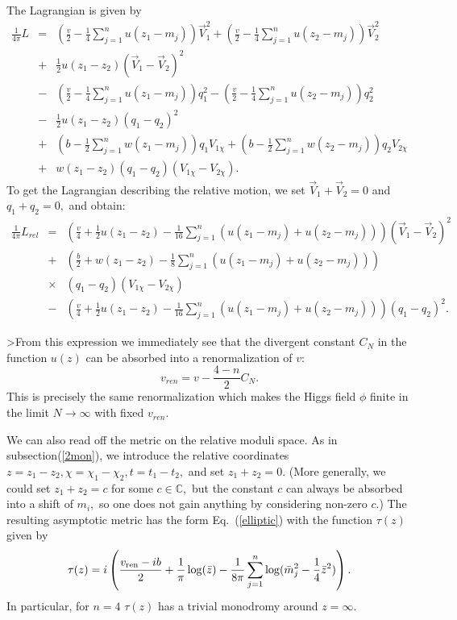\documentclass[a4paper,12pt, amsfonts, amssymb]{article}
\newcommand{\CC}{{\mathbb C}}
\newcommand{\ra}{\rightarrow}
\newcommand{\nn}{\nonumber}
\newcommand{\vr}{v_{{\rm ren}}}
\begin{document}
The Lagrangian is given by
\begin{eqnarray}
\frac{1}{4\pi} L&=& \left(\frac{v}{2}-\frac{1}{4}\sum_{j=1}^n u(z_1-m_j)\right) \vec{V}_1^2+
\left(\frac{v}{2}-\frac{1}{4}\sum_{j=1}^n u(z_2-m_j)\right)\vec{V}_2^2\nn\\
&+&\frac{1}{2}u(z_1-z_2)\left(\vec{V}_1-\vec{V}_2\right)^2\nn\\
&-&\left(\frac{v}{2}-\frac{1}{4}\sum_{j=1}^n u(z_1-m_j)\right) q_1^2-
\left(\frac{v}{2}-\frac{1}{4}\sum_{j=1}^n u(z_2-m_j)\right)q_2^2\nn\\
&-&\frac{1}{2}u(z_1-z_2)\left(q_1-q_2\right)^2\nn\\
&+&\left(b-\frac{1}{2}\sum_{j=1}^n w(z_1-m_j)\right)q_1V_{1\chi}+
\left(b-\frac{1}{2}\sum_{j=1}^n w(z_2-m_j)\right)q_2V_{2\chi}\nn\\
&+&w(z_1-z_2)(q_1-q_2)\left(V_{1\chi}-V_{2\chi}\right).\nn
\end{eqnarray}
To get the Lagrangian describing the relative motion, we set $\vec{V}_1+\vec{V}_2=0$ and $q_1+q_2=0,$ and obtain:
\begin{eqnarray}
\frac{1}{4\pi}L_{rel}\!\!\!&=&\!\!\!\left(\frac{v}{4}+\frac{1}{2}u(z_1-z_2)-
\frac{1}{16}\sum_{j=1}^n(u(z_1-m_j)+u(z_2-m_j))\right)
\left(\vec{V}_1-\vec{V}_2\right)^2\nn\\
&+&\!\!\!\left(\frac{b}{2}+w(z_1-z_2)-\frac{1}{8}
\sum_{j=1}^n(u(z_1-m_j)+u(z_2-m_j))\right)\nn\\
&\times &\!\!\! (q_1-q_2)\left(V_{1\chi}-V_{2\chi}\right)\nn\\
&-&\!\!\!\left(\frac{v}{4}+\frac{1}{2}u(z_1-z_2)-\frac{1}{16}
\sum_{j=1}^n(u(z_1-m_j)+u(z_2-m_j))\right)(q_1-q_2)^2.\nn
\end{eqnarray}

>From this expression we immediately see that the divergent constant $C_N$
in the function $u(z)$ can be absorbed into a renormalization of $v$:
$$
v_{ren}=v-\frac{4-n}{2} C_N.
$$
This is precisely the same renormalization which makes the Higgs field
$\phi$ finite in the limit $N\ra\infty$ with fixed $v_{ren}.$

We can also read off the metric on the relative moduli space.
As in subsection(\ref{2mon}), we introduce the relative coordinates
$z=z_1-z_2, \chi=\chi_1-\chi_2, t=t_1-t_2,$ and set $z_1+z_2=0.$ (More generally, we could set $z_1+z_2=c$ for some $c\in\CC,$ but the constant
$c$ can always be absorbed into a shift of $m_i,$ so one does not gain
anything by considering non-zero
$c$.) The resulting asymptotic metric has the form Eq.~(\ref{elliptic})
with the function $\tau(z)$ given by
\begin{equation}\label{tausing}
\tau(z)=i\left(\frac{\vr-ib}{2}+\frac{1}{\pi}\log(\bar{z})-
\frac{1}{8\pi}\sum_{j=1}^n\log(\bar{m}_j^2-\frac{1}{4}\bar{z}^2)\right).
\end{equation}
In particular, for $n=4$ $\tau(z)$ has a trivial monodromy around
$z=\infty.$
\end{document}
